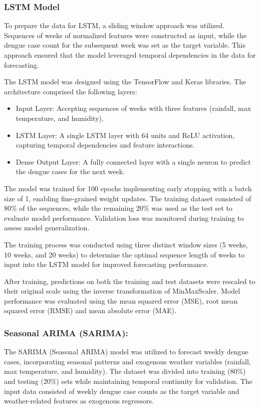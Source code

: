\subsubsection{LSTM Model}
To prepare the data for LSTM, a sliding window approach was utilized. Sequences of weeks of normalized features were constructed as input, while the dengue case count for the subsequent week was set as the target variable. This approach ensured that the model leveraged temporal dependencies in the data for forecasting.

The LSTM model was designed using the TensorFlow and Keras libraries. The architecture comprised the following layers:
\begin{itemize}
	\item Input Layer: Accepting sequences of weeks with three features (rainfall, max temperature, and humidity).
	\item LSTM Layer: A single LSTM layer with 64 units and ReLU activation, capturing temporal dependencies and feature interactions.
	\item Dense Output Layer: A fully connected layer with a single neuron to predict the dengue cases for the next week.
\end{itemize}
The model was trained for 100 epochs implementing early stopping with a batch size of 1, enabling fine-grained weight updates. The training dataset consisted of 80\% of the sequences, while the remaining 20\% was used as the test set to evaluate model performance. Validation loss was monitored during training to assess model generalization.

The training process was conducted using three distinct window sizes (5 weeks, 10 weeks, and 20 weeks) to determine the optimal sequence length of weeks to input into the LSTM model for improved forecasting performance.

After training, predictions on both the training and test datasets were rescaled to their original scale using the inverse transformation of MinMaxScaler. Model performance was evaluated using the mean squared error (MSE), root mean squared error (RMSE) and mean absolute error (MAE).

\subsubsection{Seasonal ARIMA (SARIMA):}
The SARIMA (Seasonal ARIMA) model was utilized to forecast weekly dengue cases, incorporating seasonal patterns and exogenous weather variables (rainfall, max temperature, and humidity). The dataset was divided into training (80\%) and testing (20\%) sets while maintaining temporal continuity for validation. The input data consisted of weekly dengue case counts as the target variable and weather-related features as exogenous regressors.

